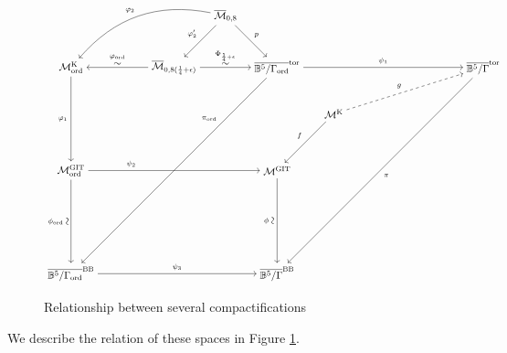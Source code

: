 \documentclass[12pt, pdftex]{amsart}
\newcommand{\rotatesim}{\rotatebox[origin=c]{90}{$\sim$}}
\theoremstyle{plain}
\theoremstyle{definition}
\numberwithin{equation}{section}
\def\B{{\mathbb B}}
\def\ord{\mathrm{ord}}
\def\GIT{\mathrm{GIT}}
\def\K{\mathrm{K}}
\def\tor{\mathrm{tor}}
\def\BB{\mathrm{BB}}
\def\M{\mathcal{M}}
\begin{document}
\begin{figure}[h]
\centering
\[
  \begin{tikzpicture}[
    labelsize/.style={font=\scriptsize},
    isolabelsize/.style={font=\normalsize},
    hom/.style={->,auto,labelsize},
    scale=0.9,
  ]
  
  \node(K) at (0,8) {$\M_{\ord}^{\K}$};
  \node(Qu) at (4,8) {$\overline{\M}_{0,8(\frac{1}{4}+\epsilon)}$};
  \node(ctor) at (8,8) {$\overline{\B^5/\Gamma_{\ord}}^{\tor}$}; %
  \node(rtor) at (16,8) {$\overline{\B^5/\Gamma}^{\tor}$}; %
  \node(git) at (0,4) {$\M^{\GIT}_{\ord}$};
  \node(gitl) at (8,4) {$\M^{\GIT}$};
  \node(lbb) at (0,0) {$\overline{\B^5/\Gamma_{\ord}}^{\BB}$}; %
  \node(cbb) at (8,0) {$\overline{\B^5/\Gamma}^{\BB}$}; %
  \node(k) at (10.2,6.2) {$\M^{\K}$};
  \node(s) at (6,10) {$\overline{\M}_{0,8}$};
  
  \draw[hom,swap] (Qu) to node[align=center,yshift=-2pt]{
    {\scriptsize $\varphi_{\ord}$}\\
    {\normalsize $\sim$}
  } (K);
  \draw[hom] (Qu) to node[align=center,yshift=-2pt]{
    {\scriptsize $\Phi_{\frac{1}{4}+\epsilon}$}\\
    {\normalsize $\sim$}
  } (ctor);
  \draw[hom,swap] (git) to  node[align=center,xshift=5pt]{
    {\scriptsize $\phi_{\ord}$}
    {\normalsize$\rotatesim$}
  } (lbb);
  \draw[hom,swap] (gitl) to node[align=center,xshift=5pt]{
    {\scriptsize $\phi$}
    \normalsize$\rotatesim$
  } (cbb);
  
  \draw[hom] (ctor) to node{$\psi_1$} (rtor);
  \draw[hom,near start] (git) to node{$\psi_2$} (gitl);
  \draw[hom] (lbb) to node{$\psi_3$} (cbb);
  \draw[hom,swap] (K) to node{$\varphi_1$} (git);
  \draw[hom,swap] (s) to node{$\varphi_2'$} (Qu);
  \draw[hom] (s) to node{$p$} (ctor);
  \draw[hom,swap] (k) to node{$f$} (gitl);
  \draw[hom,dashed] (k) to node{$g$} (rtor);
  \draw[hom,near start,swap] (ctor) to node{$\pi_{\ord}$} (lbb);
  \draw[hom] (rtor) to node{$\pi$} (cbb);
  \draw[hom,bend right,swap](s) to node{$\varphi_2$}(K);
  
  \end{tikzpicture}
\]
\caption{Relationship between several compactifications}
\label{com_diag}
\end{figure}






We describe the relation of these spaces in Figure \ref{com_diag}.
\end{document}
